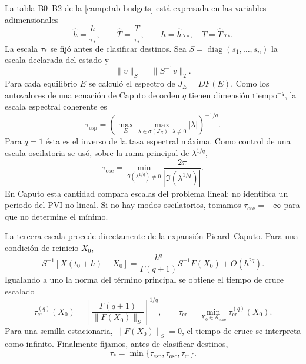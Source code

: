 La tabla B0--B2 de la \cref{camp:tab-budgets} está expresada en las variables
adimensionales
\begin{equation}
 \widehat h=\frac{h}{\tau_*},\qquad
 \widehat T=\frac{T}{\tau_*},
 \qquad
 h=\widehat h\,\tau_*,\quad T=\widehat T\,\tau_*.
 \label{pilot:eq-budget-dimensionalization}
\end{equation}
La escala $\tau_*$ se fijó antes de clasificar destinos. Sea
$S=\operatorname{diag}(s_1,\ldots,s_n)$ la escala declarada del estado y
\begin{equation}
 \lVert v\rVert_S=\lVert S^{-1}v\rVert_2.
 \label{pilot:eq-scaled-norm}
\end{equation}
Para cada equilibrio $E$ se calculó el espectro de $J_E=DF(E)$. Como los
autovalores de una ecuación de Caputo de orden $q$ tienen dimensión
$\mathrm{tiempo}^{-q}$, la escala espectral coherente es
\begin{equation}
 \tau_{\mathrm{esp}}
 =\left(
   \max_{E}\max_{\lambda\in\sigma(J_E),\ \lambda\ne0}|\lambda|
  \right)^{-1/q}.
 \label{pilot:eq-tau-spectral}
\end{equation}
Para $q=1$ ésta es el inverso de la tasa espectral máxima. Como control de una
escala oscilatoria se usó, sobre la rama principal de $\lambda^{1/q}$,
\begin{equation}
 \tau_{\mathrm{osc}}
 =\min_{\Im(\lambda^{1/q})\ne0}
   \frac{2\pi}{|\Im(\lambda^{1/q})|}.
 \label{pilot:eq-tau-oscillatory}
\end{equation}
En Caputo esta cantidad compara escalas del problema lineal; no identifica
un periodo del PVI no lineal. Si no hay modos oscilatorios, tomamos
$\tau_{\mathrm{osc}}=+\infty$ para que no determine el mínimo.

La tercera escala procede directamente de la expansión Picard--Caputo. Para
una condición de reinicio $X_0$,
\begin{equation}
 S^{-1}[X(t_0+h)-X_0]
 =\frac{h^q}{\Gamma(q+1)}S^{-1}F(X_0)+O(h^{2q}).
 \label{pilot:eq-scaled-picard-crossing}
\end{equation}
Igualando a uno la norma del término principal se obtiene el tiempo de cruce
escalado
\begin{equation}
 \tau_{\mathrm{cr}}^{(q)}(X_0)
 =\left[
   \frac{\Gamma(q+1)}{\lVert F(X_0)\rVert_S}
  \right]^{1/q},
 \qquad
 \tau_{\mathrm{cr}}
 =\min_{X_0\in\mathcal S_{\mathrm{core}}}
   \tau_{\mathrm{cr}}^{(q)}(X_0).
 \label{pilot:eq-tau-crossing}
\end{equation}
Para una semilla estacionaria, $\lVert F(X_0)\rVert_S=0$, el tiempo de
cruce se interpreta como infinito. Finalmente fijamos, antes de clasificar
destinos,
\begin{equation}
 \tau_*=\min\{\tau_{\mathrm{esp}},\tau_{\mathrm{osc}},
                    \tau_{\mathrm{cr}}\}.
 \label{pilot:eq-tau-star}
\end{equation}

